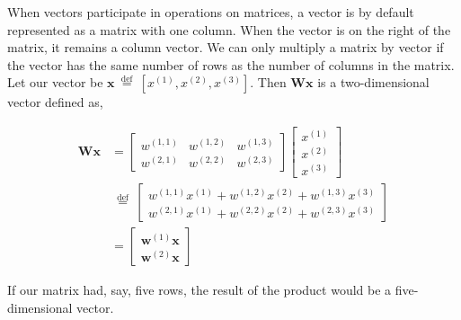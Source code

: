 \documentclass[9pt,dvipsnames]{beamer}
\begin{document}
\begin{frame}
	When vectors participate in operations on matrices, a vector is by default represented as a matrix with one column. When the vector is on the right of the matrix, it remains a column vector. We can only multiply a matrix by vector if the vector has the same number of rows as the number of columns in the matrix. Let our vector be $\mathbf{x} \stackrel{\text { def }}{=}\left[x^{(1)}, x^{(2)}, x^{(3)}\right]$. Then $\mathbf{W} \mathbf{x}$ is a two-dimensional vector defined as,

	$$
		\begin{aligned}
			\mathbf{W} \mathbf{x} & =\left[\begin{array}{lll}
					                               w^{(1,1)} & w^{(1,2)} & w^{(1,3)} \\
					                               w^{(2,1)} & w^{(2,2)} & w^{(2,3)}
				                               \end{array}\right]\left[\begin{array}{l}
					                                                       x^{(1)} \\
					                                                       x^{(2)} \\
					                                                       x^{(3)}
				                                                       \end{array}\right]                                      \\
			                      & \stackrel{\text { def }}{=}\left[\begin{array}{l}
					                                                         w^{(1,1)} x^{(1)}+w^{(1,2)} x^{(2)}+w^{(1,3)} x^{(3)} \\
					                                                         w^{(2,1)} x^{(1)}+w^{(2,2)} x^{(2)}+w^{(2,3)} x^{(3)}
				                                                         \end{array}\right] \\
			                      & =\left[\begin{array}{l}
					                               \mathbf{w}^{(1)} \mathbf{x} \\
					                               \mathbf{w}^{(2)} \mathbf{x}
				                               \end{array}\right]
		\end{aligned}
	$$

	If our matrix had, say, five rows, the result of the product would be a five-dimensional vector.
\end{frame}
\end{document}
